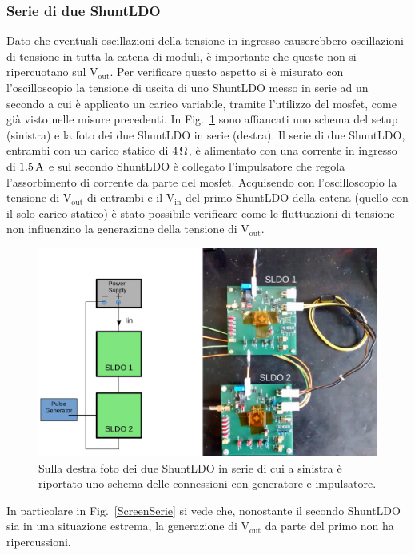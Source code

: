 \subsubsection{Serie di due ShuntLDO}

Dato che eventuali oscillazioni della tensione in ingresso causerebbero oscillazioni di tensione in tutta la catena di moduli, è importante che queste non si ripercuotano sul $\mathrm{V_{out}}$. 
Per verificare questo aspetto si è misurato con l'oscilloscopio la tensione di uscita di uno ShuntLDO messo in serie ad un secondo a cui è applicato un carico variabile, tramite l'utilizzo del mosfet, come già visto nelle misure precedenti.
In Fig.~\ref{SLDOserie} sono affiancati uno schema del setup (sinistra) e la foto dei due ShuntLDO in serie (destra). 
Il serie di due ShuntLDO, entrambi con un carico statico di $4 {\rm \, \Omega}$, è alimentato con una corrente in ingresso di $1.5 \rm \, A$ e sul secondo ShuntLDO è collegato l'impulsatore che regola l'assorbimento di corrente  da parte del mosfet. 
Acquisendo con l'oscilloscopio la tensione di $\mathrm{V_{out}}$ di entrambi e il $\mathrm{V_{in}}$ del primo ShuntLDO della catena (quello con il solo carico statico) è stato possibile verificare come le fluttuazioni di tensione non influenzino la generazione della tensione di $\mathrm{V_{out}}$.
\begin{figure}[h!]
\centering
\includegraphics[scale=.30]{Immagini/SLDOserie}
\caption{Sulla destra foto dei due ShuntLDO in serie di cui a sinistra è riportato uno schema delle connessioni con generatore e impulsatore.}
\label{SLDOserie}
\end{figure}
In particolare in Fig.~\ref{ScreenSerie} si vede che, nonostante il secondo ShuntLDO sia in una situazione estrema, la generazione di $\mathrm{V_{out}}$ da parte del primo non ha ripercussioni. 
